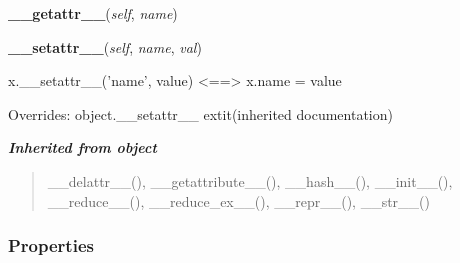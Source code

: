     \label{nMOLDYN:Core:GlobalVariables:nMOLDYNPreferences:__getattr__}

    \vspace{0.5ex}

\hspace{.8\funcindent}\begin{boxedminipage}{\funcwidth}

    \raggedright \textbf{\_\_getattr\_\_}(\textit{self}, \textit{name})

\setlength{\parskip}{2ex}
\setlength{\parskip}{1ex}
    \end{boxedminipage}

    \vspace{0.5ex}

\hspace{.8\funcindent}\begin{boxedminipage}{\funcwidth}

    \raggedright \textbf{\_\_setattr\_\_}(\textit{self}, \textit{name}, \textit{val})

\setlength{\parskip}{2ex}
    x.\_\_setattr\_\_('name', value) {\textless}=={\textgreater} x.name = 
    value

\setlength{\parskip}{1ex}
      Overrides: object.\_\_setattr\_\_ 	extit{(inherited documentation)}

    \end{boxedminipage}


\large{\textbf{\textit{Inherited from object}}}

\begin{quote}
\_\_delattr\_\_(), \_\_getattribute\_\_(), \_\_hash\_\_(), \_\_init\_\_(), \_\_reduce\_\_(), \_\_reduce\_ex\_\_(), \_\_repr\_\_(), \_\_str\_\_()
\end{quote}


  \subsubsection{Properties}

